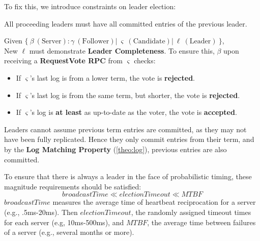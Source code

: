 \noindent
To fix this, we introduce constraints on leader election:

\begin{Def}

    All proceeding leaders must have all committed entries of the previous leader.
\end{Def}

\begin{Def}

    Given $\{\ \beta\ (\text{Server}): \gamma\ (\text{Follower})  |\ \varsigma\ (\text{Candidate}) |\ \ell\ (\text{Leader})\ \}$,\\
    New $\ell$ must demonstrate \textbf{Leader Completeness}. To ensure this, $\beta$ upon receiving a \textbf{RequestVote RPC} from $\varsigma$ checks:
    \begin{itemize}
        \item If $\varsigma$'s last log is from a lower term, the vote is \textbf{rejected}.
        \item If $\varsigma$'s last log is from the same term, but shorter, the vote is \textbf{rejected}.
        \item If $\varsigma$'s log is \textbf{at least} as up-to-date as the voter, the vote is \textbf{accepted}.
    \end{itemize}
\end{Def}

\begin{theo}

    Leaders cannot assume previous term entries are committed, as they may not have been fully replicated.
    Hence they only commit entries from their term, and by the \textbf{Log Matching Property} (\ref{theo:log}), previous entries are also committed.
\end{theo}

\begin{theo}

    To ensure that there is always a leader in the face of probabilistic timing, these 
    magnitude requirements should be satisfied:
    $$
    broadcastTime \ll electionTimeout \ll MTBF
    $$
    \noindent
    $broadcastTime$ measures the average time of heartbeat reciprocation for a server (e.g., .5ms-20ms).
    Then $electionTimeout$, the randomly assigned timeout times for each server (e.g, 10ms-500ms), and $MTBF$, the
    average time between failures of a server (e.g., several months or more).
\end{theo}

